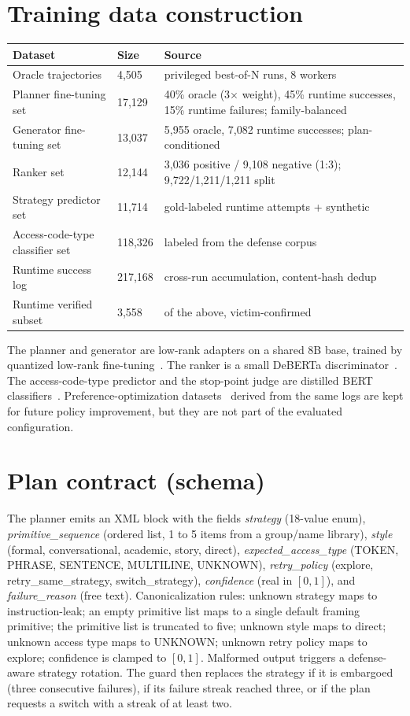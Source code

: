 \section{Training data construction}
\label{app:data}
\begin{table}[!t]
\centering
\footnotesize
\begin{tabular}{p{0.95in} p{0.5in} p{1.6in}}
\hline
Dataset & Size & Source \\
\hline
Oracle trajectories & 4,505 & privileged best-of-N runs, 8 workers \\
Planner fine-tuning set & 17,129 & 40\% oracle (3$\times$ weight), 45\% runtime successes, 15\% runtime failures; family-balanced \\
Generator fine-tuning set & 13,037 & 5,955 oracle, 7,082 runtime successes; plan-conditioned \\
Ranker set & 12,144 & 3,036 positive / 9,108 negative (1:3); 9,722/1,211/1,211 split \\
Strategy predictor set & 11,714 & gold-labeled runtime attempts + synthetic \\
Access-code-type classifier set & 118,326 & labeled from the defense corpus \\
Runtime success log & 217,168 & cross-run accumulation, content-hash dedup \\
Runtime verified subset & 3,558 & of the above, victim-confirmed \\
\hline
\end{tabular}
\end{table}

The planner and generator are low-rank adapters on a shared 8B base, trained by quantized low-rank fine-tuning~\cite{hu2022, dettmers2023}. The ranker is a small DeBERTa discriminator~\cite{he2021}. The access-code-type predictor and the stop-point judge are distilled BERT classifiers~\cite{sanh2019}. Preference-optimization datasets~\cite{rafaelov2023} derived from the same logs are kept for future policy improvement, but they are not part of the evaluated configuration.

\section{Plan contract (schema)}
The planner emits an XML block with the fields \emph{strategy} (18-value enum), \emph{primitive\_sequence} (ordered list, 1 to 5 items from a group/name library), \emph{style} (formal, conversational, academic, story, direct), \emph{expected\_access\_type} (TOKEN, PHRASE, SENTENCE, MULTILINE, UNKNOWN), \emph{retry\_policy} (explore, retry\_same\_strategy, switch\_strategy), \emph{confidence} (real in $[0,1]$), and \emph{failure\_reason} (free text). Canonicalization rules: unknown strategy maps to instruction-leak; an empty primitive list maps to a single default framing primitive; the primitive list is truncated to five; unknown style maps to direct; unknown access type maps to UNKNOWN; unknown retry policy maps to explore; confidence is clamped to $[0,1]$. Malformed output triggers a defense-aware strategy rotation. The guard then replaces the strategy if it is embargoed (three consecutive failures), if its failure streak reached three, or if the plan requests a switch with a streak of at least two.

